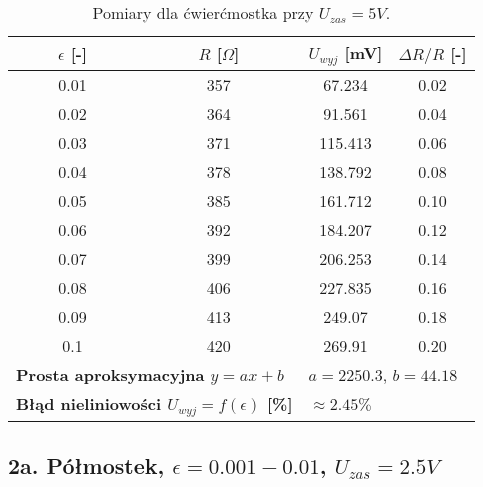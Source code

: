 \documentclass[12pt, a4paper]{article}
\begin{document}
	\begin{table}[H]
		\centering
		\caption{Pomiary dla ćwierćmostka przy $U_{zas} = 5 V$.}
		\begin{tabular}{cccc}
			\toprule
			$\epsilon$ [-] & $R$ [$\Omega$] & $U_{wyj}$ [mV] & $\Delta R/R$ [-] \\
			\midrule
			0.01 & 357 & 67.234 & 0.02 \\
			0.02 & 364 & 91.561 & 0.04 \\
			0.03 & 371 & 115.413 & 0.06 \\
			0.04 & 378 & 138.792 & 0.08 \\
			0.05 & 385 & 161.712 & 0.10 \\
			0.06 & 392 & 184.207 & 0.12 \\
			0.07 & 399 & 206.253 & 0.14 \\
			0.08 & 406 & 227.835 & 0.16 \\
			0.09 & 413 & 249.07 & 0.18 \\
			0.1 & 420 & 269.91 & 0.20 \\
			\midrule
			\multicolumn{2}{l}{\textbf{Prosta aproksymacyjna $y = ax + b$}} & \multicolumn{2}{l}{$a = 2250.3$, $b = 44.18$} \\
			\multicolumn{2}{l}{\textbf{Błąd nieliniowości $U_{wyj} = f(\epsilon)$ [\%]}} & \multicolumn{2}{l}{$\approx 2.45 \%$} \\
			\bottomrule
		\end{tabular}
	\end{table}
	
	\newpage
	\subsection{2a. Półmostek, $\epsilon = 0.001-0.01$, $U_{zas} = 2.5 V$}
	
\end{document}
